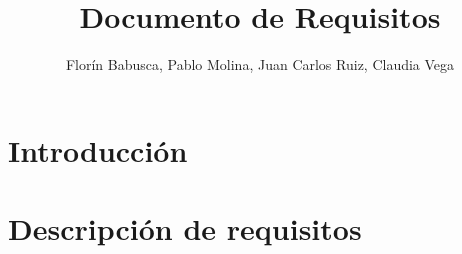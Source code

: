 \documentclass[12pt, a4paper]{exam}
\title{\textbf{Documento de Requisitos}}
\author{Florín Babusca, Pablo Molina, Juan Carlos Ruiz, Claudia Vega}
\begin{document}

\begin{titlingpage}
\maketitle
\end{titlingpage}
\tableofcontents


\section{Introducción}


\section{Descripción de requisitos}



\end{document}
